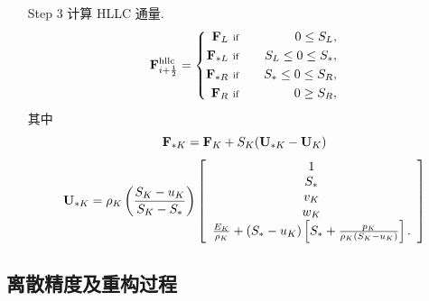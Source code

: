 \begin{itemize}
\begin{itemize}
  \item[Step 3] 计算 HLLC 通量.
    \begin{equation}
      \label{eq:HLLC-flux}
      {\bf{F}}_{i+\frac{1}{2}}^{\mbox{\scriptsize hllc}} =
      \left\{
        \begin{aligned}
          {\bf{F}}_{L} & ~\mbox{\scriptsize if} \quad & 0 \le
          S_{L},\\
          {\bf{F}}_{\ast L} & ~\mbox{\scriptsize if} \quad &
          S_{L} \le 0 \le S_{\ast},\\
          {\bf{F}}_{\ast R} & ~\mbox{\scriptsize if} \quad &
          S_{\ast} \le 0 \le S_{R},\\
          {\bf{F}}_{R} & ~\mbox{\scriptsize if} \quad & 0 \ge S_{R},
        \end{aligned}
      \right.
    \end{equation}
    其中
    \begin{equation}
      \label{eq:star-region-flux}
      {\bf{F}}_{\ast K} = {\bf{F}}_{K} + S_{K}({\bf{U}}_{\ast K}
      - {\bf{U}}_{K})
    \end{equation}
    \begin{equation}
      \label{eq:star-region-value}
      {\bf{U}}_{\ast K} = \rho_{K} \left(
        \frac{S_{K}-u_{K}}{S_{K}-S_{\ast}}
      \right)
      \left[
        \begin{array}{c}
          1\\
          S_{\ast}\\
          v_{K}\\
          w_{K}\\
          \frac{E_{K}}{\rho_{K}} + (S_{\ast}-u_{K})
          \left[
            S_{\ast} + \frac{p_{K}}{\rho_{K}(S_{K}-u_{K})}
          \right].
        \end{array}
      \right]
    \end{equation}
  \end{itemize}
\end{itemize}

\subsection{离散精度及重构过程}
\label{sec:accuracy-and-reconstruction}


